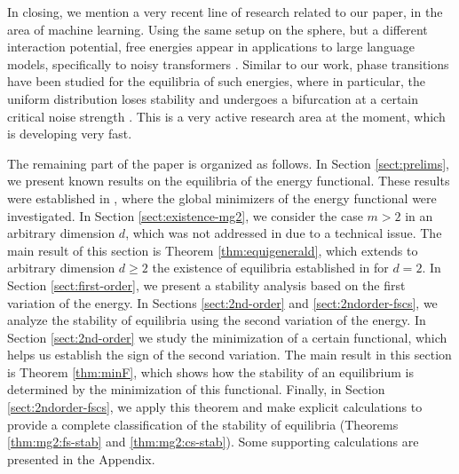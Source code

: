 \documentclass[11pt]{amsart}
\newcommand{\dm}{d} %
\begin{document}
In closing, we mention a very recent line of research related to our paper, in the area of machine learning. Using the same setup on the sphere, but a different interaction potential, free energies appear in applications to large language models, specifically to noisy transformers \cite{Geshkovski_etal2025}. Similar to our work, phase transitions have been studied for the equilibria of such energies, where in particular, the uniform distribution loses stability and undergoes a bifurcation at a certain critical noise strength \cite{Balasubramanian_etal2025, Gerber_etal2025, mun2026phase2, mun2026phase1, ShalovaSchlichting2025}. This is a very active research area at the moment, which is developing very fast.

The remaining part of the paper is organized as follows. In Section \ref{sect:prelims}, we present known results on the equilibria of the energy functional. These results were established in \cite{FePaVa2025}, where the global minimizers of the energy functional were investigated. In Section \ref{sect:existence-mg2}, we consider the case $m>2$ in an arbitrary dimension $\dm$, which was not addressed in \cite{FePaVa2025} due to a technical issue. The main result of this section is Theorem \ref{thm:equigenerald}, which extends to arbitrary dimension $\dm \geq 2$ the existence of equilibria established in \cite{FePaVa2025} for $\dm=2$. In Section \ref{sect:first-order}, we present a stability analysis based on the first variation of the energy. In Sections \ref{sect:2nd-order} and \ref{sect:2ndorder-fscs}, we analyze the stability of equilibria using the second variation of the energy. In Section \ref{sect:2nd-order} we study the minimization of a certain functional, which helps us establish the sign of the second variation. The main result in this section is Theorem \ref{thm:minF}, which shows how the stability of an equilibrium is determined by the minimization of this functional. Finally, in Section \ref{sect:2ndorder-fscs}, we apply this theorem and make explicit calculations to provide a complete classification of the stability of equilibria (Theorems \ref{thm:mg2:fs-stab} and \ref{thm:mg2:cs-stab}). Some supporting calculations are presented in the Appendix.

\end{document}
